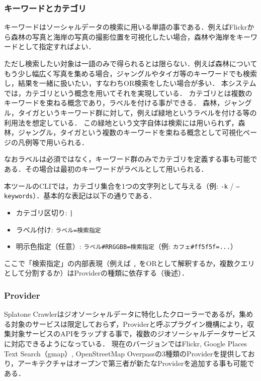 \documentclass[11pt,a4paper]{jlreq}
\begin{document}
\subsubsection{キーワードとカテゴリ}

キーワードはソーシャルデータの検索に用いる単語の事である．例えばFlickrから森林の写真と海岸の写真の撮影位置を可視化したい場合，森林や海岸をキーワードとして指定すればよい．

ただし検索したい対象は一語のみで得られるとは限らない．例えば森林についてもう少し幅広く写真を集める場合，ジャングルやタイガ等のキーワードでも検索し，結果を一緒に扱いたい，すなわちOR検索をしたい場合が多い．
本システムでは，カテゴリという概念を用いてそれを実現している．
カテゴリとは複数のキーワードを束ねる概念であり，ラベルを付ける事ができる．
森林，ジャングル，タイガというキーワード群に対して，例えば緑地というラベルを付ける等の利用法を想定している．
この緑地という文字自体は検索には用いられず，森林，ジャングル，タイガという複数のキーワードを束ねる概念として可視化ページの凡例等で用いられる．

なおラベルは必須ではなく，キーワード群のみでカテゴリを定義する事も可能である．その場合は最初のキーワードがラベルとして用いられる．

本ツールのCLIでは，カテゴリ集合を1つの文字列として与える（例: \texttt{-k} / \texttt{--keywords}）．基本的な表記は以下の通りである．
\begin{itemize}
  \item カテゴリ区切り: \texttt{|}
  \item ラベル付け: \texttt{ラベル=検索指定}
  \item 明示色指定（任意）: \texttt{ラベル\#RRGGBB=検索指定}（例: \texttt{カフェ\#ff5f5f=...}）
\end{itemize}
ここで「検索指定」の内部表現（例えば \texttt{,} をORとして解釈するか，複数クエリとして分割するか）はProviderの種類に依存する（後述）．

\subsubsection{Provider}

Splatone Crawlerはジオソーシャルデータに特化したクローラーであるが，集める対象のサービスは限定しておらず，Providerと呼ぶプラグイン機構により，収集対象サービスのAPIをラップする事で，複数のジオソーシャルデータサービスに対応できるようになっている．
現在のバージョンではFlickr, Google Places Text Search（gmap）, OpenStreetMap Overpassの3種類のProviderを提供しており，アーキテクチャはオープンで第三者が新たなProviderを追加する事も可能である．
\end{document}
